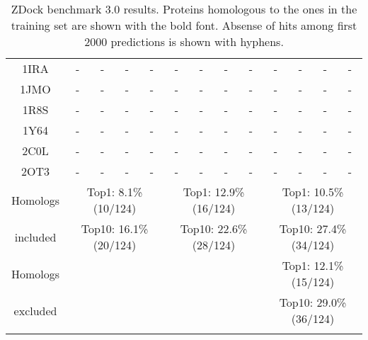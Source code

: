 \begin{longtable}{c c c c c|c c c c|c c c c}
 {\tiny 1IRA} &{\tiny -}&{\tiny -}&{\tiny -}&{\tiny -} &{\tiny -}&{\tiny -}&{\tiny -}&{\tiny -} &{\tiny -}&{\tiny -}&{\tiny -}&{\tiny -}\\ 
 {\tiny 1JMO} &{\tiny -}&{\tiny -}&{\tiny -}&{\tiny -} &{\tiny -}&{\tiny -}&{\tiny -}&{\tiny -} &{\tiny -}&{\tiny -}&{\tiny -}&{\tiny -}\\ 
 {\tiny 1R8S} &{\tiny -}&{\tiny -}&{\tiny -}&{\tiny -} &{\tiny -}&{\tiny -}&{\tiny -}&{\tiny -} &{\tiny -}&{\tiny -}&{\tiny -}&{\tiny -}\\ 
 {\tiny 1Y64} &{\tiny -}&{\tiny -}&{\tiny -}&{\tiny -} &{\tiny -}&{\tiny -}&{\tiny -}&{\tiny -} &{\tiny -}&{\tiny -}&{\tiny -}&{\tiny -}\\ 
 {\tiny 2C0L} &{\tiny -}&{\tiny -}&{\tiny -}&{\tiny -} &{\tiny -}&{\tiny -}&{\tiny -}&{\tiny -} &{\tiny -}&{\tiny -}&{\tiny -}&{\tiny -}\\ 
 {\tiny 2OT3} &{\tiny -}&{\tiny -}&{\tiny -}&{\tiny -} &{\tiny -}&{\tiny -}&{\tiny -}&{\tiny -} &{\tiny -}&{\tiny -}&{\tiny -}&{\tiny -}\\ 
 \hline
{\tiny Homologs}& \multicolumn{4}{c}{\tiny Top1: 8.1\% (10/124)} & \multicolumn{4}{c}{\tiny Top1: 12.9\% (16/124)} & \multicolumn{4}{c}{\tiny Top1: 10.5\% (13/124)}  \\ 
 {\tiny included}& \multicolumn{4}{c}{\tiny Top10: 16.1\% (20/124)} & \multicolumn{4}{c}{\tiny Top10: 22.6\% (28/124)} & \multicolumn{4}{c}{\tiny Top10: 27.4\% (34/124)}  \\ 
 \hline
{\tiny Homologs}& \multicolumn{4}{c}{} & \multicolumn{4}{c}{} & \multicolumn{4}{c}{\tiny Top1: 12.1\% (15/124)}\\
{\tiny excluded}& \multicolumn{4}{c}{} & \multicolumn{4}{c}{} & \multicolumn{4}{c}{\tiny Top10: 29.0\% (36/124)}\\
\caption[ZDock benchmark 3.0 results]{ZDock benchmark 3.0 results. Proteins homologous to the ones in the training set are shown with the bold font. 
Absense of hits among first 2000 predictions is shown with hyphens.}
\label{ZDockTable} 
 \end{longtable}